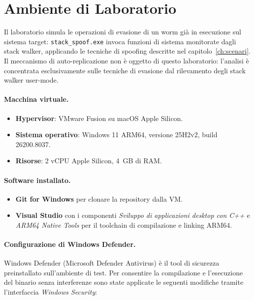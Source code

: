 
\section{Ambiente di Laboratorio}
\label{sec:ambiente}

Il laboratorio simula le operazioni di evasione di un worm già in esecuzione
sul sistema target: \texttt{stack\_spoof.exe} invoca funzioni di sistema monitorate dagli stack walker, applicando le tecniche di spoofing descritte nel capitolo~\ref{ch:scenari}. Il meccanismo di auto-replicazione non è oggetto di questo
laboratorio: l'analisi è concentrata esclusivamente sulle tecniche di evasione
dal rilevamento degli stack walker user-mode.

\paragraph{Macchina virtuale.}
\begin{itemize}
  \item \textbf{Hypervisor}: VMware Fusion su macOS Apple Silicon.
  \item \textbf{Sistema operativo}: Windows 11 ARM64, versione 25H2v2,
        build 26200.8037.
  \item \textbf{Risorse}: 2 vCPU Apple Silicon, 4~GB di RAM.
\end{itemize}

\paragraph{Software installato.}
\begin{itemize}
  \item \textbf{Git for Windows} per clonare la repository dalla VM.
  \item \textbf{Visual Studio} con i componenti \emph{Sviluppo di applicazioni
        desktop con C++} e \emph{ARM64 Native Tools} per il toolchain di
        compilazione e linking ARM64.
\end{itemize}

\paragraph{Configurazione di Windows Defender.}
Windows Defender (Microsoft Defender Antivirus) è il tool di sicurezza
preinstallato sull'ambiente di test. Per consentire la compilazione e
l'esecuzione del binario senza interferenze sono state applicate le seguenti
modifiche tramite l'interfaccia \emph{Windows Security}:

